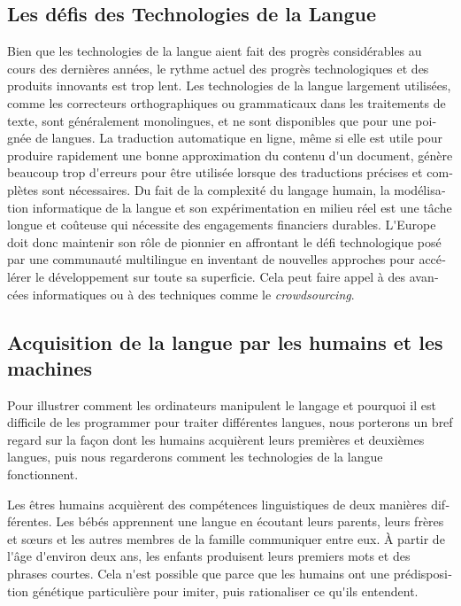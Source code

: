 \documentclass[]{../metanetpaper}
\begin{document}
\begin{french}
\begin{multicols}{2}
\subsection{Les défis des Technologies de la Langue}

Bien que les technologies de la langue aient fait des progrès
considérables au cours des dernières années, le rythme actuel des
progrès technologiques et des produits innovants est trop lent. Les
technologies de la langue largement utilisées, comme les correcteurs
orthographiques ou grammaticaux dans les traitements de texte, sont
généralement monolingues, et ne sont disponibles que pour une poignée
de langues. La traduction automatique en ligne, même si elle est utile
pour produire rapidement une bonne approximation du contenu d{\mbox
 '}un document, génère beaucoup trop d{\mbox '}erreurs pour être
utilisée lorsque des traductions précises et complètes sont
nécessaires. Du fait de la complexité du langage humain, la
modélisation informatique de la langue et son expérimentation en
milieu réel est une tâche longue et coûteuse qui nécessite des
engagements financiers durables. L{\mbox '}Europe doit donc maintenir
son rôle de pionnier en affrontant le défi technologique posé par une
communauté multilingue en inventant de nouvelles approches pour
accélérer le développement sur toute sa superficie. Cela peut faire
appel à des avancées informatiques ou à des techniques comme le {\it
  crowdsourcing}.


\subsection{Acquisition de la langue par les humains et les machines}

Pour illustrer comment les ordinateurs manipulent le langage et pourquoi
il est difficile de les programmer pour traiter différentes langues,
nous porterons un bref regard sur la façon dont les humains acquièrent
leurs premières et deuxièmes langues, puis nous regarderons comment
les technologies de la langue fonctionnent.

Les êtres humains acquièrent des compétences linguistiques de deux
manières différentes. Les bébés apprennent une langue en écoutant
leurs parents, leurs frères et sœurs et les autres membres de la
famille communiquer entre eux. À partir de l{\mbox '}âge d{\mbox
  '}environ deux ans, les enfants produisent leurs premiers mots et
des phrases courtes. Cela n{\mbox '}est possible que parce que les
humains ont une prédisposition génétique particulière pour imiter,
puis rationaliser ce qu{\mbox '}ils entendent.


\end{multicols}
\end{french}
\end{document}
